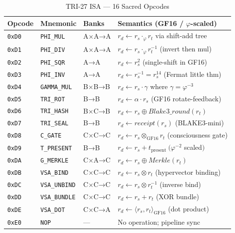 \begin{table}[H]
\centering
\caption{TRI-27 ISA — 16 Sacred Opcodes}
\label{tab:71:opcodes}
\small
\begin{tabular}{lllp{5.5cm}}
\toprule
Opcode & Mnemonic & Banks & Semantics (GF16 / $\varphi$-scaled) \\
\midrule
\texttt{0xD0} & \texttt{PHI\_MUL}    & A×A→A & $r_d \leftarrow r_s \cdot_{\varphi} r_t$ via shift-add tree \\
\texttt{0xD1} & \texttt{PHI\_DIV}    & A×A→A & $r_d \leftarrow r_s \cdot_{\varphi} r_t^{-1}$ (invert then mul) \\
\texttt{0xD2} & \texttt{PHI\_SQR}    & A→A   & $r_d \leftarrow r_s^2$ (single-shift in GF16) \\
\texttt{0xD3} & \texttt{PHI\_INV}    & A→A   & $r_d \leftarrow r_s^{-1} = r_s^{14}$ (Fermat little thm) \\
\texttt{0xD4} & \texttt{GAMMA\_MUL}  & B×B→B & $r_d \leftarrow r_s \cdot \gamma$ where $\gamma = \varphi^{-3}$ \\
\texttt{0xD5} & \texttt{TRI\_ROT}    & B→B   & $r_d \leftarrow \alpha \cdot r_s$ (GF16 rotate-feedback) \\
\texttt{0xD6} & \texttt{TRI\_HASH}   & B×C→B & $r_d \leftarrow r_s \oplus \mathit{Blake3\_round}(r_t)$ \\
\texttt{0xD7} & \texttt{TRI\_SEAL}   & B→B   & $r_d \leftarrow \mathit{receipt}(r_s)$ (BLAKE3-mini) \\
\texttt{0xD8} & \texttt{C\_GATE}     & C×C→C & $r_d \leftarrow r_s \otimes_{\mathrm{GF}16} r_t$ (consciousness gate) \\
\texttt{0xD9} & \texttt{T\_PRESENT}  & B→B   & $r_d \leftarrow r_s + t_{\mathrm{present}}\ (\varphi^{-2}$ scaled$)$ \\
\texttt{0xDA} & \texttt{G\_MERKLE}   & C×A→C & $r_d \leftarrow r_s \oplus \mathit{Merkle}(r_t)$ \\
\texttt{0xDB} & \texttt{VSA\_BIND}   & C×C→C & $r_d \leftarrow r_s \otimes r_t$ (hypervector binding) \\
\texttt{0xDC} & \texttt{VSA\_UNBIND} & C×C→C & $r_d \leftarrow r_s \otimes r_t^{-1}$ (inverse bind) \\
\texttt{0xDD} & \texttt{VSA\_BUNDLE} & C×C→C & $r_d \leftarrow r_s + r_t$ (XOR bundle) \\
\texttt{0xDE} & \texttt{VSA\_DOT}    & C×C→A & $r_d \leftarrow \langle r_s, r_t\rangle_{\mathrm{GF}16}$ (dot product) \\
\texttt{0xE0} & \texttt{NOP}         & —     & No operation; pipeline sync \\
\bottomrule
\end{tabular}
\end{table}

